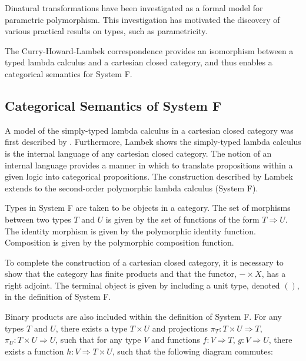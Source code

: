 \documentclass[../../Dissertation.tex]{subfiles}
\begin{document}
Dinatural transformations have been investigated as a formal model for parametric polymorphism. This investigation has motivated the discovery of various practical results on types, such as parametricity.
\par
{}
\par
The Curry-Howard-Lambek correspondence provides an isomorphism between a typed lambda calculus and a cartesian closed category, and thus enables a categorical semantics for System F.

\subsection{Categorical Semantics of System F}\label{sec:systemfcat}
A model of the simply-typed lambda calculus in a cartesian closed category was first described by . Furthermore, Lambek shows the simply-typed lambda calculus is the internal language of any cartesian closed category. The notion of an internal language provides a manner in which to translate propositions within a given logic into categorical propositions. The construction described by Lambek extends to the second-order polymorphic lambda calculus (System F).
\par
Types in System F are taken to be objects in a category. The set of morphisms between two types $T$ and $U$ is given by the set of functions of the form $T \Rightarrow U$. The identity morphism is given by the polymorphic identity function. Composition is given by the polymorphic composition function.
\par
To complete the construction of a cartesian closed category, it is necessary to show that the category has finite products and that the functor, $- \times X$, has a right adjoint. The terminal object is given by including a unit type, denoted $()$, in the definition of System F. 
\par
Binary products are also included within the definition of System F. For any types $T$ and $U$, there exists a type $T \times U$ and projections $\pi_{T} : T \times U \Rightarrow T$, $\pi_{U} : T \times U \Rightarrow U$, such that for any type $V$ and functions $f : V \Rightarrow T$, $g : V \Rightarrow U$, there exists a function $h : V \Rightarrow T \times U$, such that the following diagram commutes:
\end{document}
